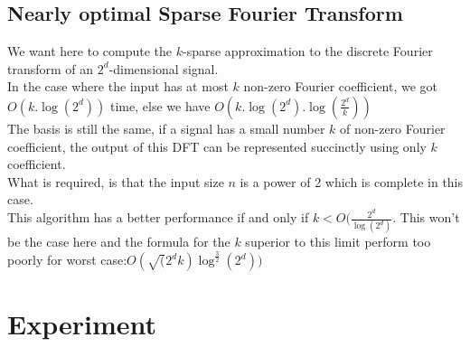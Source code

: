 \documentclass{article}
\begin{document}
\subsection{Nearly optimal Sparse Fourier Transform}

We want here to compute the $k$-sparse approximation to the discrete Fourier transform of an $2^d$-dimensional signal.\\
In the case where the input has at most $k$ non-zero Fourier coefficient, we got $O(k.\log(2^d))$ time, else we have $O(k.\log(2^d).\log(\frac{2^d}{k}))$\\
The basis is still the same, if a signal has a small number $k$ of non-zero Fourier coefficient, the output of this DFT can be represented succinctly using only $k$ coefficient.\\
What is required, is that the input size $n$ is a power of 2 which is complete in this case.\\
This algorithm has a better performance if and only if $ k < O(\frac{2^d}{\log(2^d)}$. This won't be the case here and the formula for the $k$ superior to this limit perform too poorly for worst case:$O(\sqrt(2^d k) \log^{\frac{3}{2}}(2^d))$


\section{Experiment}
\end{document}
